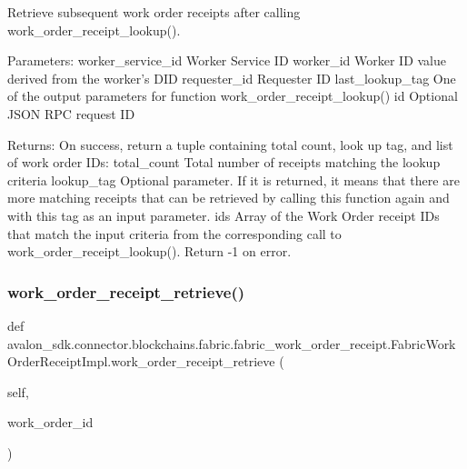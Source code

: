 \begin{DoxyVerb}Retrieve subsequent work order receipts after calling
work_order_receipt_lookup().

Parameters:
worker_service_id Worker Service ID
worker_id         Worker ID value derived from the worker's DID
requester_id      Requester ID
last_lookup_tag   One of the output parameters for function
          work_order_receipt_lookup()
id                Optional JSON RPC request ID

Returns:
On success, return a tuple containing total count, look up tag, and
list of work order IDs:
total_count       Total number of receipts matching the lookup
          criteria
lookup_tag        Optional parameter. If it is returned, it means
          that there are more matching receipts that can be
          retrieved by calling this function again and with
          this tag as an input parameter.
ids               Array of the Work Order receipt IDs that match the
          input criteria from the corresponding call to
          work_order_receipt_lookup().
Return -1 on error.
\end{DoxyVerb}
 \mbox{\label{classavalon__sdk_1_1connector_1_1blockchains_1_1fabric_1_1fabric__work__order__receipt_1_1FabricWorkOrderReceiptImpl_af6f8879cf963e054ced76ec4dd31fe0c}} 
\subsubsection{\texorpdfstring{work\+\_\+order\+\_\+receipt\+\_\+retrieve()}{work\_order\_receipt\_retrieve()}}
{\footnotesize\ttfamily def avalon\+\_\+sdk.\+connector.\+blockchains.\+fabric.\+fabric\+\_\+work\+\_\+order\+\_\+receipt.\+Fabric\+Work\+Order\+Receipt\+Impl.\+work\+\_\+order\+\_\+receipt\+\_\+retrieve (\begin{DoxyParamCaption}\item[{}]{self,  }\item[{}]{work\+\_\+order\+\_\+id }\end{DoxyParamCaption})}

